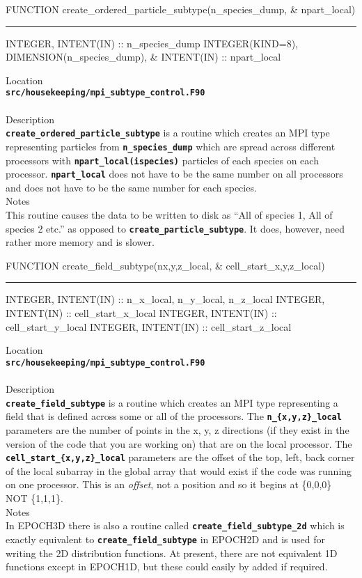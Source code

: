 \documentclass[12pt,a4paper]{article}
\newcommand{\HRule}{\rule[0.3cm]{\linewidth}{0.5mm}}
\newcommand{\inlinecode}[1]{{\color{warwickred} \bf\texttt{#1}}}
\begin{document}
\pagebreak
\begin{codedef}
FUNCTION create_ordered_particle_subtype(n_species_dump, &
    npart_local)
\HRule
INTEGER, INTENT(IN) :: n_species_dump
INTEGER(KIND=8), DIMENSION(n_species_dump), &
    INTENT(IN) :: npart_local
\end{codedef}
\vspace{1cm}
{\Large Location\\}
\inlinecode{src/housekeeping/mpi\_subtype\_control.F90}\\
\\[0.5cm]
{\Large Description\\}
\inlinecode{create\_ordered\_particle\_subtype} is a routine which creates an
MPI type representing particles from \inlinecode{n\_species\_dump} which are
spread across different processors with \inlinecode{npart\_local(ispecies)}
particles of each species on each processor. \inlinecode{npart\_local} does not
have to be the same number on all processors and does not have to be the same
number for each species.
\\[0.5cm]
{\Large Notes\\}
This routine causes the data to be written to disk as ``All of species 1, All of
species 2 etc.'' as opposed to \inlinecode{create\_particle\_subtype}. It does,
however, need rather more memory and is slower.

\pagebreak
\begin{codedef}
FUNCTION create_field_subtype(n{x,y,z}_local, &
    cell_start_{x,y,z}_local)
\HRule
INTEGER, INTENT(IN) :: n_x_local, n_y_local, n_z_local
INTEGER, INTENT(IN) :: cell_start_x_local
INTEGER, INTENT(IN) :: cell_start_y_local
INTEGER, INTENT(IN) :: cell_start_z_local
\end{codedef}
\vspace{1cm}
{\Large Location\\}
\inlinecode{src/housekeeping/mpi\_subtype\_control.F90}\\
\\[0.5cm]
{\Large Description\\}
\inlinecode{create\_field\_subtype} is a routine which creates an MPI type
representing a field that is defined across some or all of the processors. The
\inlinecode{n\_\{x,y,z\}\_local} parameters are the number of points in the x,
y, z directions (if they exist in the version of the code that you are working
on) that are on the local processor. The
\inlinecode{cell\_start\_\{x,y,z\}\_local} parameters are the offset of the
top, left, back corner of the local subarray in the global array that would
exist if the code was running on one processor. This is an {\it offset}, not a
position and so it begins at \{0,0,0\} NOT \{1,1,1\}.
\\[0.5cm]
{\Large Notes\\}
In EPOCH3D there is also a routine called
\inlinecode{create\_field\_subtype\_2d} which is exactly equivalent to
\inlinecode{create\_field\_subtype} in EPOCH2D and is used for writing the 2D
distribution functions. At present, there are not equivalent 1D functions
except in EPOCH1D, but these could easily by added if required.
\end{document}
